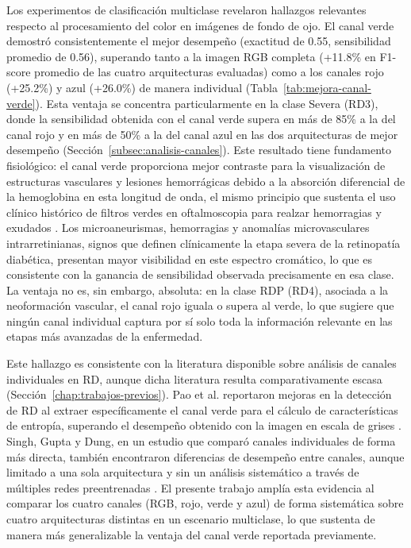 Los experimentos de clasificación multiclase revelaron hallazgos relevantes respecto al
procesamiento del color en imágenes de fondo de ojo. El canal verde demostró
consistentemente el mejor desempeño (exactitud de 0.55, sensibilidad promedio de 0.56),
superando tanto a la imagen RGB completa (+11.8\% en F1-score promedio de las cuatro
arquitecturas evaluadas) como a los canales rojo (+25.2\%) y azul (+26.0\%) de manera
individual (Tabla~\ref{tab:mejora-canal-verde}). Esta ventaja se concentra
particularmente en la clase Severa (RD3), donde la sensibilidad obtenida con el canal
verde supera en más de 85\% a la del canal rojo y en más de 50\% a la del canal azul en las dos
arquitecturas de mejor desempeño (Sección~\ref{subsec:analisis-canales}). Este resultado
tiene fundamento fisiológico: el canal verde proporciona mejor contraste para la
visualización de estructuras vasculares y lesiones hemorrágicas debido a la absorción
diferencial de la hemoglobina en esta longitud de onda, el mismo principio que sustenta
el uso clínico histórico de filtros verdes en oftalmoscopia para realzar hemorragias y
exudados . Los microaneurismas, hemorragias y anomalías
microvasculares intrarretinianas, signos que definen clínicamente la etapa severa de la
retinopatía diabética, presentan mayor visibilidad en este espectro cromático, lo que es
consistente con la ganancia de sensibilidad observada precisamente en esa clase. La ventaja no
es, sin embargo, absoluta: en la clase RDP (RD4), asociada a la neoformación vascular, el
canal rojo iguala o supera al verde, lo que sugiere que ningún canal individual captura
por sí solo toda la información relevante en las etapas más avanzadas de la enfermedad.

Este hallazgo es consistente con la literatura disponible sobre análisis de canales
individuales en RD, aunque dicha literatura resulta comparativamente escasa
(Sección~\ref{chap:trabajos-previos}). Pao et al. reportaron mejoras en la detección de
RD al extraer específicamente el canal verde para el cálculo de características de
entropía, superando el desempeño obtenido con la imagen en escala de grises
. Singh, Gupta y Dung, en un estudio que comparó canales
individuales de forma más directa, también encontraron diferencias de desempeño entre
canales, aunque limitado a una sola arquitectura y sin un análisis sistemático a través de
múltiples redes preentrenadas . El presente trabajo amplía
esta evidencia al comparar los cuatro canales (RGB, rojo, verde y azul) de forma
sistemática sobre cuatro arquitecturas distintas en un escenario multiclase, lo que
sustenta de manera más generalizable la ventaja del canal verde reportada previamente.


